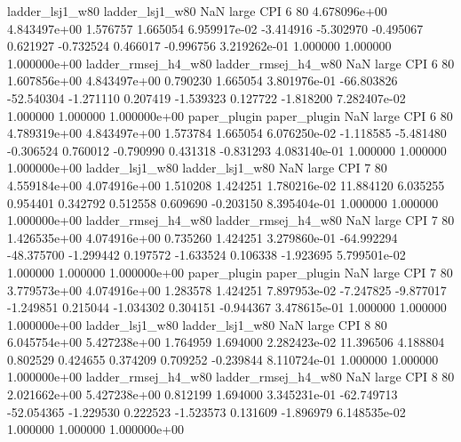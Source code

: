     ladder_lsj1_w80     ladder_lsj1_w80                   NaN      large      CPI                 6 80 4.678096e+00   4.843497e+00      1.576757       1.665054  6.959917e-02     -3.414916     -5.302970    -0.495067       0.621927 -0.732524   0.466017    -0.996756   3.219262e-01            1.000000        1.000000        1.000000e+00
ladder_rmsej_h4_w80 ladder_rmsej_h4_w80                   NaN      large      CPI                 6 80 1.607856e+00   4.843497e+00      0.790230       1.665054  3.801976e-01    -66.803826    -52.540304    -1.271110       0.207419 -1.539323   0.127722    -1.818200   7.282407e-02            1.000000        1.000000        1.000000e+00
       paper_plugin        paper_plugin                   NaN      large      CPI                 6 80 4.789319e+00   4.843497e+00      1.573784       1.665054  6.076250e-02     -1.118585     -5.481480    -0.306524       0.760012 -0.790990   0.431318    -0.831293   4.083140e-01            1.000000        1.000000        1.000000e+00
    ladder_lsj1_w80     ladder_lsj1_w80                   NaN      large      CPI                 7 80 4.559184e+00   4.074916e+00      1.510208       1.424251  1.780216e-02     11.884120      6.035255     0.954401       0.342792  0.512558   0.609690    -0.203150   8.395404e-01            1.000000        1.000000        1.000000e+00
ladder_rmsej_h4_w80 ladder_rmsej_h4_w80                   NaN      large      CPI                 7 80 1.426535e+00   4.074916e+00      0.735260       1.424251  3.279860e-01    -64.992294    -48.375700    -1.299442       0.197572 -1.633524   0.106338    -1.923695   5.799501e-02            1.000000        1.000000        1.000000e+00
       paper_plugin        paper_plugin                   NaN      large      CPI                 7 80 3.779573e+00   4.074916e+00      1.283578       1.424251  7.897953e-02     -7.247825     -9.877017    -1.249851       0.215044 -1.034302   0.304151    -0.944367   3.478615e-01            1.000000        1.000000        1.000000e+00
    ladder_lsj1_w80     ladder_lsj1_w80                   NaN      large      CPI                 8 80 6.045754e+00   5.427238e+00      1.764959       1.694000  2.282423e-02     11.396506      4.188804     0.802529       0.424655  0.374209   0.709252    -0.239844   8.110724e-01            1.000000        1.000000        1.000000e+00
ladder_rmsej_h4_w80 ladder_rmsej_h4_w80                   NaN      large      CPI                 8 80 2.021662e+00   5.427238e+00      0.812199       1.694000  3.345231e-01    -62.749713    -52.054365    -1.229530       0.222523 -1.523573   0.131609    -1.896979   6.148535e-02            1.000000        1.000000        1.000000e+00
